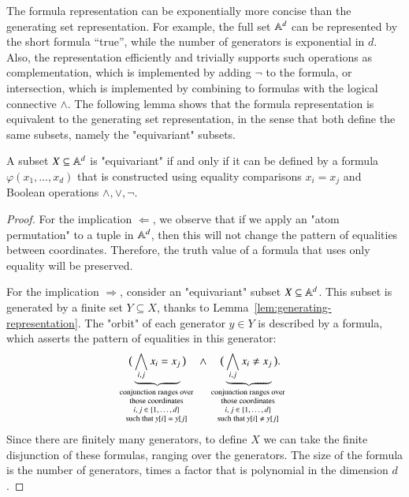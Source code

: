 The formula representation can be exponentially more concise than the generating set representation. For example, the full set $\mathbb A^d$ can be represented by the short formula ``true'', while the number of generators is exponential in $d$. Also, the representation efficiently and trivially supports such operations as complementation, which is implemented by  adding $\neg$ to the formula, or intersection, which is implemented by combining to formulas with the logical connective $\land$. The following lemma shows that the formula representation is equivalent to the generating set representation, in the sense that both define the same subsets, namely the "equivariant" subsets.

\begin{lemma}\label{lem:formula-representation}
 A subset $X \subseteq \mathbb A^d$ is "equivariant" if and only if it can be defined by a formula $\varphi(x_1,\ldots,x_d)$ that is constructed using equality comparisons $x_i = x_j$ and Boolean operations $\land, \lor, \neg$.
\end{lemma}
\begin{proof}
    For the implication $\Leftarrow$, we observe that if we apply an "atom permutation" to a tuple in $\mathbb A^d$, then this will not change the pattern of  equalities between coordinates. Therefore, the truth value of a formula that uses only equality will be preserved.

    For the implication $\Rightarrow$, consider an "equivariant" subset $X \subseteq \mathbb A^d$. This subset is generated by a finite set $Y \subseteq X$, thanks to  Lemma~\ref{lem:generating-representation}. The "orbit" of each generator $y \in Y$ is described by a formula, which asserts the pattern of equalities in this generator: 
    \begin{align*}
       \big(\myunderbrace{\bigwedge_{i,j} x_i = x_j}{conjunction ranges over \\  those coordinates \\ $i,j \in \set{1,\ldots,d}$ \\ such that $y[i] = y[j]$} \big)
    \quad \land \quad \big(\myunderbrace{\bigwedge_{i,j} x_i \neq x_j}{conjunction ranges over \\ those coordinates \\  $i,j \in \set{1,\ldots,d}$ \\ such that $y[i] \neq y[j]$} \big).
    \end{align*}
    Since there are finitely many generators, to define $X$ we can take the finite disjunction of these formulas, ranging over the generators. 
    The size of the formula is the number of generators, times a factor that is polynomial in the dimension $d$. 
\end{proof}

